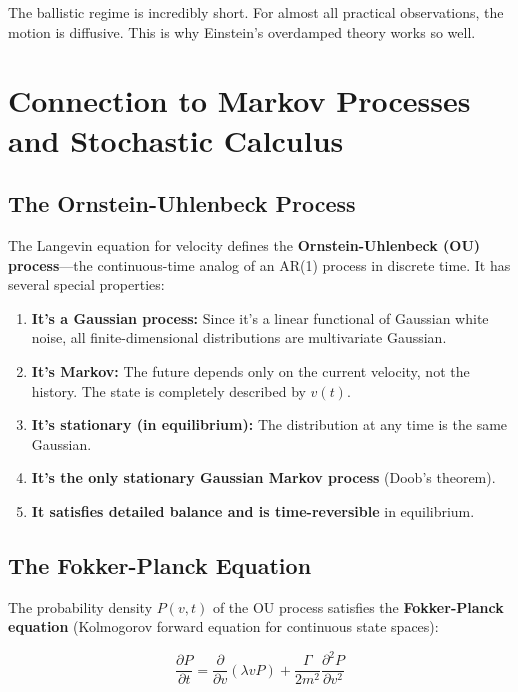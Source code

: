 \documentclass[11pt,a4paper]{article}
\begin{document}
	The ballistic regime is incredibly short. For almost all practical observations, the motion is diffusive. This is why Einstein's overdamped theory works so well.
	
	\section{Connection to Markov Processes and Stochastic Calculus}
	
	\subsection{The Ornstein-Uhlenbeck Process}
	
	The Langevin equation for velocity defines the \textbf{Ornstein-Uhlenbeck (OU) process}---the continuous-time analog of an AR(1) process in discrete time. It has several special properties:
	
	\begin{enumerate}[label=\arabic*.]
		\item \textbf{It's a Gaussian process:} Since it's a linear functional of Gaussian white noise, all finite-dimensional distributions are multivariate Gaussian.
		\item \textbf{It's Markov:} The future depends only on the current velocity, not the history. The state is completely described by $v(t)$.
		\item \textbf{It's stationary (in equilibrium):} The distribution at any time is the same Gaussian.
		\item \textbf{It's the only stationary Gaussian Markov process} (Doob's theorem).
		\item \textbf{It satisfies detailed balance and is time-reversible} in equilibrium.
	\end{enumerate}
	
	\subsection{The Fokker-Planck Equation}
	
	The probability density $P(v,t)$ of the OU process satisfies the \textbf{Fokker-Planck equation} (Kolmogorov forward equation for continuous state spaces):
	
	\begin{equation}
		\frac{\partial P}{\partial t} = \frac{\partial}{\partial v}\left( \lambda v P \right) + \frac{\Gamma}{2m^2} \frac{\partial^2 P}{\partial v^2}
	\end{equation}
	
\end{document}
